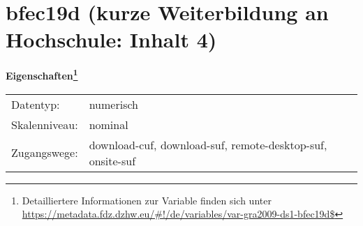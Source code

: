 
    \setcounter{footnote}{0}

    \vspace*{-1.8cm}
	\section{bfec19d (kurze Weiterbildung an Hochschule: Inhalt 4)}
	\label{section:bfec19d}



    \vspace*{0.5cm}
    \noindent\textbf{Eigenschaften\footnote{Detailliertere Informationen zur Variable finden sich unter
		\url{https://metadata.fdz.dzhw.eu/\#!/de/variables/var-gra2009-ds1-bfec19d$}}}\\
	\begin{tabularx}{\hsize}{@{}lX}
	Datentyp: & numerisch \\
	Skalenniveau: & nominal \\
	Zugangswege: &
	  download-cuf, 
	  download-suf, 
	  remote-desktop-suf, 
	  onsite-suf
 \\
    \end{tabularx}



